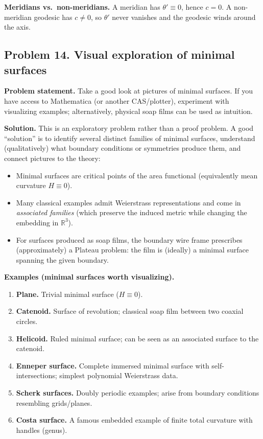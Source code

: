 \documentclass[12pt,a4paper]{article}
\theoremstyle{plain}
\theoremstyle{definition}      %
\begin{document}
	\medskip
	\textbf{Meridians vs.\ non-meridians.}
	A meridian has $\theta'\equiv 0$, hence $c=0$.
	A non-meridian geodesic has $c\neq 0$, so $\theta'$ never vanishes and the geodesic winds around the axis.
	
	
	\subsection*{Problem 14. Visual exploration of minimal surfaces}
	
	\textbf{Problem statement.}
	Take a good look at pictures of minimal surfaces. If you have access to Mathematica (or another CAS/plotter), experiment with
	visualizing examples; alternatively, physical soap films can be used as intuition.
	
	\medskip
	\textbf{Solution.}
	This is an exploratory problem rather than a proof problem. A good ``solution'' is to identify several distinct families of
	minimal surfaces, understand (qualitatively) what boundary conditions or symmetries produce them, and connect pictures to the theory:
	\begin{itemize}
		\item Minimal surfaces are critical points of the area functional (equivalently mean curvature $H\equiv 0$).
		\item Many classical examples admit Weierstrass representations and come in \emph{associated families}
		(which preserve the induced metric while changing the embedding in $\mathbb R^3$).
		\item For surfaces produced as soap films, the boundary wire frame prescribes (approximately) a Plateau problem:
		the film is (ideally) a minimal surface spanning the given boundary.
	\end{itemize}
	
	\medskip
	\textbf{Examples (minimal surfaces worth visualizing).}
	\begin{enumerate}
		\item \textbf{Plane.} Trivial minimal surface ($H\equiv 0$).
		\item \textbf{Catenoid.} Surface of revolution; classical soap film between two coaxial circles.
		\item \textbf{Helicoid.} Ruled minimal surface; can be seen as an associated surface to the catenoid.
		\item \textbf{Enneper surface.} Complete immersed minimal surface with self-intersections; simplest polynomial Weierstrass data.
		\item \textbf{Scherk surfaces.} Doubly periodic examples; arise from boundary conditions resembling grids/planes.
		\item \textbf{Costa surface.} A famous embedded example of finite total curvature with handles (genus).
	\end{enumerate}
	
	

	
	
	
	
\end{document}
